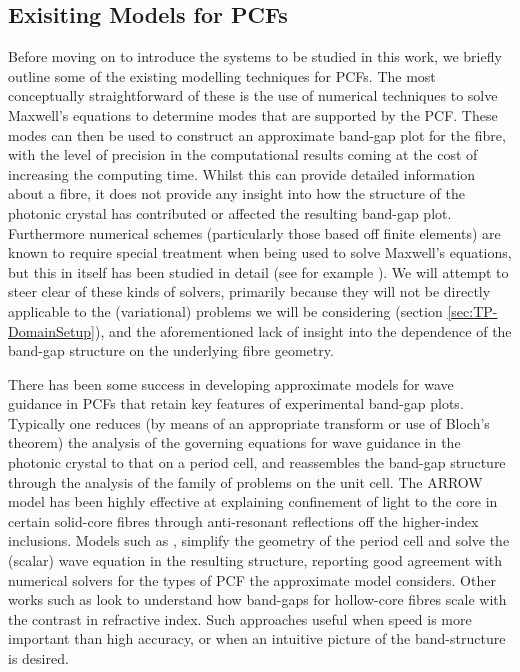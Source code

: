 \subsection{Exisiting Models for PCFs} \label{ssec:ExistingPCFModels}
Before moving on to introduce the systems to be studied in this work, we briefly outline some of the existing modelling techniques for PCFs.
The most conceptually straightforward of these is the use of numerical techniques to solve Maxwell's equations to determine modes that are supported by the PCF.
These modes can then be used to construct an approximate band-gap plot for the fibre, with the level of precision in the computational results coming at the cost of increasing the computing time.
Whilst this can provide detailed information about a fibre, it does not provide any insight into how the structure of the photonic crystal has contributed or affected the resulting band-gap plot.
Furthermore numerical schemes (particularly those based off finite elements) are known to require special treatment when being used to solve Maxwell's equations, but this in itself has been studied in detail (see for example \cite{monk2003finite}).
We will attempt to steer clear of these kinds of solvers, primarily because they will not be directly applicable to the (variational) problems we will be considering (section \ref{sec:TP-DomainSetup}), and the aforementioned lack of insight into the dependence of the band-gap structure on the underlying fibre geometry. \newline

There has been some success in developing approximate models for wave guidance in PCFs that retain key features of experimental band-gap plots.
Typically one reduces (by means of an appropriate transform or use of Bloch's theorem) the analysis of the governing equations for wave guidance in the photonic crystal to that on a period cell, and reassembles the band-gap structure through the analysis of the family of problems on the unit cell.
The ARROW model  has been highly effective at explaining confinement of light to the core in certain solid-core fibres through anti-resonant reflections off the higher-index inclusions.
Models such as \cite{birks2006approximate}, simplify the geometry of the period cell and solve the (scalar) wave equation in the resulting structure, reporting good agreement with numerical solvers for the types of PCF the approximate model considers.
Other works such as \cite{birks2004scaling} look to understand how band-gaps for hollow-core fibres scale with the contrast in refractive index.
Such approaches useful when speed is more important than high accuracy, or when an intuitive picture of the band-structure is desired.
